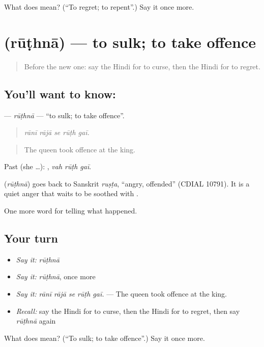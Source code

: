 \begin{tcolorbox}[breakable,colback=teal!4,colframe=teal!35!black,title={Before you move on}]
What does  mean? (\textquotedblleft{}To regret; to repent\textquotedblright{}.) Say it once more.
\end{tcolorbox}
\section[\texorpdfstring{\hi{रूठना} (rūṭhnā)}{रूठना (rūṭhnā)}]{ (rūṭhnā) — to sulk; to take offence}

\label{lesson:HI-C336-ruthna}



\begin{quote}
Before the new one: say the Hindi for to curse, then the Hindi for to regret.
\end{quote}

\subsection*{You'll want to know: }
\textbf{} — \emph{rūṭhnā} — \textquotedblleft{}to sulk; to take offence\textquotedblright{}.

\begin{quote}
    
\end{quote}

\begin{quote}
\emph{rānī rājā se rūṭh gaī.}
\end{quote}

\begin{quote}
The queen took offence at the king.
\end{quote}

Past (she …):   , \emph{vah rūṭh gaī}.

\begin{cousinweb}
\textbf{} (\emph{rūṭhnā}) goes back to Sanskrit \emph{ruṣṭa}, \textquotedblleft{}angry, offended\textquotedblright{} (CDIAL 10791). It is a quiet anger that waits to be soothed with \textbf{}.
\end{cousinweb}

\begin{grammarlens}[title={What you've built}]
One more word for telling what happened.
\end{grammarlens}

\subsection*{Your turn}
\begin{itemize}
\raggedright
  \item \emph{Say it:} \emph{rūṭhnā}
  \item \emph{Say it:} \emph{rūṭhnā}, once more
  \item \emph{Say it:} \emph{rānī rājā se rūṭh gaī.} — The queen took offence at the king.
  \item \emph{Recall:} say the Hindi for to curse, then the Hindi for to regret, then say \emph{rūṭhnā} again
\end{itemize}

\begin{tcolorbox}[breakable,colback=teal!4,colframe=teal!35!black,title={Before you move on}]
What does  mean? (\textquotedblleft{}To sulk; to take offence\textquotedblright{}.) Say it once more.
\end{tcolorbox}
